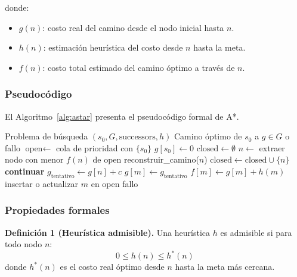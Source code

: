donde:
\begin{itemize}
    \item $g(n)$: costo real del camino desde el nodo inicial hasta $n$.
    \item $h(n)$: estimación heurística del costo desde $n$ hasta la meta.
    \item $f(n)$: costo total estimado del camino óptimo a través de $n$.
\end{itemize}

\subsubsection{Pseudocódigo}

El Algoritmo~\ref{alg:astar} presenta el pseudocódigo formal de A*.

\begin{algorithm}[H]
\caption{Algoritmo A*}
\label{alg:astar}
\begin{algorithmic}[1]
\REQUIRE Problema de búsqueda $(s_0, G, \text{successors}, h)$
\ENSURE Camino óptimo de $s_0$ a $g \in G$ o fallo
\STATE $\text{open} \leftarrow$ cola de prioridad con $\{s_0\}$
\STATE $g[s_0] \leftarrow 0$
\STATE $\text{closed} \leftarrow \emptyset$
    \STATE $n \leftarrow$ extraer nodo con menor $f(n)$ de open
        \RETURN reconstruir\_camino($n$)
    \ENDIF
    \STATE $\text{closed} \leftarrow \text{closed} \cup \{n\}$
            \STATE \textbf{continuar}
        \ENDIF
        \STATE $g_{\text{tentativo}} \leftarrow g[n] + c$
            \STATE $g[m] \leftarrow g_{\text{tentativo}}$
            \STATE $f[m] \leftarrow g[m] + h(m)$
            \STATE insertar o actualizar $m$ en open
        \ENDIF
    \ENDFOR
\ENDWHILE
\RETURN fallo
\end{algorithmic}
\end{algorithm}

\subsubsection{Propiedades formales}

\textbf{Definición 1 (Heurística admisible).} Una heurística $h$ es admisible si para todo nodo $n$:
\begin{equation}
    0 \leq h(n) \leq h^*(n)
    \label{eq:admissible}
\end{equation}
donde $h^*(n)$ es el costo real óptimo desde $n$ hasta la meta más cercana.

